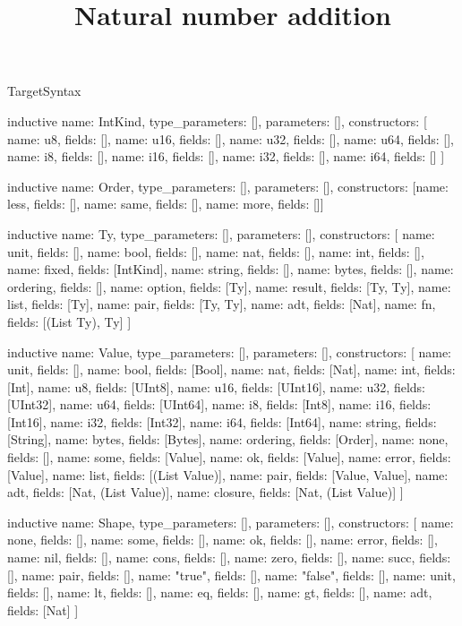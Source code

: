 \begin{lexlean}{TargetSyntax}
\title{Natural number addition}
\begin{semanticmodule}
inductive{
  name: IntKind,
  type_parameters: [],
  parameters: [],
  constructors: [
    {name: u8, fields: []},
    {name: u16, fields: []},
    {name: u32, fields: []},
    {name: u64, fields: []},
    {name: i8, fields: []},
    {name: i16, fields: []},
    {name: i32, fields: []},
    {name: i64, fields: []}
  ]
}

inductive{
  name: Order,
  type_parameters: [],
  parameters: [],
  constructors: [{name: less, fields: []}, {name: same, fields: []}, {name: more, fields: []}]
}

inductive{
  name: Ty,
  type_parameters: [],
  parameters: [],
  constructors: [
    {name: unit, fields: []},
    {name: bool, fields: []},
    {name: nat, fields: []},
    {name: int, fields: []},
    {name: fixed, fields: [IntKind]},
    {name: string, fields: []},
    {name: bytes, fields: []},
    {name: ordering, fields: []},
    {name: option, fields: [Ty]},
    {name: result, fields: [Ty, Ty]},
    {name: list, fields: [Ty]},
    {name: pair, fields: [Ty, Ty]},
    {name: adt, fields: [Nat]},
    {name: fn, fields: [(List Ty), Ty]}
  ]
}

inductive{
  name: Value,
  type_parameters: [],
  parameters: [],
  constructors: [
    {name: unit, fields: []},
    {name: bool, fields: [Bool]},
    {name: nat, fields: [Nat]},
    {name: int, fields: [Int]},
    {name: u8, fields: [UInt8]},
    {name: u16, fields: [UInt16]},
    {name: u32, fields: [UInt32]},
    {name: u64, fields: [UInt64]},
    {name: i8, fields: [Int8]},
    {name: i16, fields: [Int16]},
    {name: i32, fields: [Int32]},
    {name: i64, fields: [Int64]},
    {name: string, fields: [String]},
    {name: bytes, fields: [Bytes]},
    {name: ordering, fields: [Order]},
    {name: none, fields: []},
    {name: some, fields: [Value]},
    {name: ok, fields: [Value]},
    {name: error, fields: [Value]},
    {name: list, fields: [(List Value)]},
    {name: pair, fields: [Value, Value]},
    {name: adt, fields: [Nat, (List Value)]},
    {name: closure, fields: [Nat, (List Value)]}
  ]
}

inductive{
  name: Shape,
  type_parameters: [],
  parameters: [],
  constructors: [
    {name: none, fields: []},
    {name: some, fields: []},
    {name: ok, fields: []},
    {name: error, fields: []},
    {name: nil, fields: []},
    {name: cons, fields: []},
    {name: zero, fields: []},
    {name: succ, fields: []},
    {name: pair, fields: []},
    {name: "true", fields: []},
    {name: "false", fields: []},
    {name: unit, fields: []},
    {name: lt, fields: []},
    {name: eq, fields: []},
    {name: gt, fields: []},
    {name: adt, fields: [Nat]}
  ]
}


\end{semanticmodule}
\end{lexlean}
